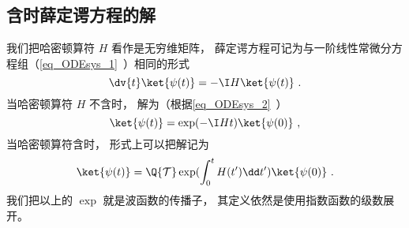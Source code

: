 \subsection{含时薛定谔方程的解}

我们把哈密顿算符 $H$ 看作是无穷维矩阵， 薛定谔方程可记为与一阶线性常微分方程组（\autoref{eq_ODEsys_1}~）相同的形式
\begin{equation}
\dv{t} \ket{\psi(t)} = -\I H \ket{\psi(t)}~.
\end{equation}
当哈密顿算符 $H$ 不含时， 解为（根据\autoref{eq_ODEsys_2}~）
\begin{equation}
\ket{\psi(t)} = \exp(-\I H t) \ket{\psi(0)}~,
\end{equation}
当哈密顿算符含时， 形式上可以把解记为
\begin{equation}
\ket{\psi(t)} = \Q {\mathcal T} \exp(\int_0^ t H(t')\dd t') \ket{\psi(0)}~.
\end{equation}
我们把以上的 $\exp$ 就是波函数的传播子， 其定义依然是使用指数函数的级数展开。
